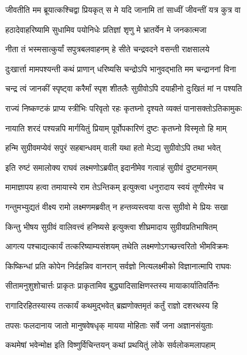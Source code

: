 \twolineshloka
{जीवतीति मम ब्रूयात्कश्चिद्वा प्रियकृत् स मे}
{यदि जानामि तां साध्वीं जीवन्तीं यत्र कुत्र वा} %

\twolineshloka
{हठादेवाहरिष्यामि सुधामिव पयोनिधेः}
{प्रतिज्ञां शृणु मे भ्रातर्येन मे जनकात्मजा} %

\twolineshloka
{नीता तं भस्मसात्कुर्यां सपुत्रबलवाहनम्}
{हे सीते चन्द्रवदने वसन्ती राक्षसालये} %

\twolineshloka
{दुःखार्त्ता मामपश्यन्ती कथं प्राणान् धरिष्यसि}
{चन्द्रोऽपि भानुवद्भाति मम चन्द्राननां विना} %

\twolineshloka
{चन्द्र त्वं जानकीं स्पृष्ट्वा करैर्मां स्पृश शीतलैः}
{सुग्रीवोऽपि दयाहीनो दुःखितं मां न पश्यति} %

\twolineshloka
{राज्यं निष्कण्टकं प्राप्य स्त्रीभिः परिवृतो रहः}
{कृतघ्नो दृश्यते व्यक्तं पानासक्तोऽतिकामुकः} %

\twolineshloka
{नायाति शरदं पश्यन्नपि मार्गयितुं प्रियाम्}
{पूर्वोपकारिणं दुष्टः कृतघ्नो विस्मृतो हि माम्} %

\twolineshloka
{हन्मि सुग्रीवमप्येवं सपुरं सहबान्धवम्}
{वाली यथा हतो मेऽद्य सुग्रीवोऽपि तथा भवेत्} %

\twolineshloka
{इति रुष्टं समालोक्य राघवं लक्ष्मणोऽब्रवीत्}
{इदानीमेव गत्वाहं सुग्रीवं दुष्टमानसम्} %

\twolineshloka
{मामाज्ञापय हत्वा तमायास्ये राम तेऽन्तिकम्}
{इत्युक्त्वा धनुरादाय स्वयं तूणीरमेव च} %

\twolineshloka
{गन्तुमभ्युद्यतं वीक्ष्य रामो लक्ष्मणमब्रवीत्}
{न हन्तव्यस्त्वया वत्स सुग्रीवो मे प्रियः सखा} %

\twolineshloka
{किन्तु भीषय सुग्रीवं वालिवत्त्वं हनिष्यसे}
{इत्युक्त्वा शीघ्रमादाय सुग्रीवप्रतिभाषितम्} %

\twolineshloka
{आगत्य पश्चाद्यत्कार्यं तत्करिष्याम्यसंशयम्}
{तथेति लक्ष्मणोऽगच्छत्त्वरितो भीमविक्रमः} %

\twolineshloka
{किष्किन्धां प्रति कोपेन निर्दहन्निव वानरान्}
{सर्वज्ञो नित्यलक्ष्मीको विज्ञानात्मापि राघवः} %

\twolineshloka
{सीतामनुशुशोचार्त्तः प्राकृतः प्राकृतामिव}
{बुद्ध्यादिसाक्षिणस्तस्य मायाकार्यातिवर्तिनः} %

\twolineshloka
{रागादिरहितस्यास्य तत्कार्यं कथमुद्भवेत्}
{ब्रह्मणोक्तमृतं कर्तुं राज्ञो दशरथस्य हि} %

\twolineshloka
{तपसः फलदानाय जातो मानुषवेषधृक्}
{मायया मोहिताः सर्वे जना अज्ञानसंयुताः} %

\twolineshloka
{कथमेषां भवेन्मोक्ष इति विष्णुर्विचिन्तयन्}
{कथां प्रथयितुं लोके सर्वलोकमलापहाम्} %

